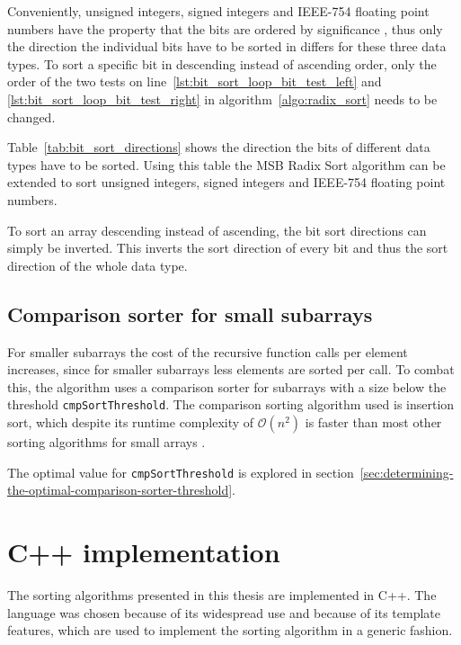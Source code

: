 \documentclass[12pt, a4paper, openright, twoside]{tiarbeit}
\begin{document}
Conveniently, unsigned integers, signed integers and IEEE-754 floating point numbers
have the property that the bits are ordered by significance \citep{float_radix_sort},
thus only the direction the individual bits have to be sorted in differs for these
three data types.
To sort a specific bit in descending instead of ascending order, only
the order of the two tests on line~\ref{lst:bit_sort_loop_bit_test_left}
and \ref{lst:bit_sort_loop_bit_test_right} in algorithm~\ref{algo:radix_sort}
needs to be changed.

Table~\ref{tab:bit_sort_directions} shows the direction the bits of different
data types have to be sorted. Using this table the MSB Radix Sort algorithm can be extended to sort
unsigned integers, signed integers and IEEE-754 floating point numbers.

To sort an array descending instead of ascending, the bit sort directions can simply be
inverted. This inverts the sort direction of every bit and thus the sort direction
of the whole data type.


\section{Comparison sorter for small subarrays}
\label{sec:comparison_sorter_for_small_subarrays_seq}

For smaller subarrays the cost of the recursive function calls
per element increases, since for smaller subarrays less elements are sorted
per call. To combat this, the algorithm uses a comparison sorter for subarrays
with a size below the threshold \texttt{cmpSortThreshold}.
The comparison sorting algorithm used is insertion sort, which despite
its runtime complexity of $\mathcal{O}(n^2)$ is faster than most other sorting algorithms
for small arrays \citep{cs241_sorting}.

The optimal value for \texttt{cmpSortThreshold} is explored in
section~\ref{sec:determining-the-optimal-comparison-sorter-threshold}.



\chapter{C++ implementation}\label{chap:cpp_implementation}

The sorting algorithms presented in this thesis are implemented in C++.
The language was chosen because of its widespread use and because of its
template features, which are used to implement the sorting algorithm in
a generic fashion.
\end{document}
